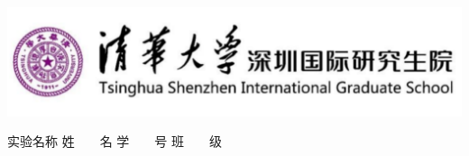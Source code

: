 \begin{titlepage}
    \voffset 2.7cm
    \begin{center}

        \includegraphics[width=15cm]{cover/logo}\\[1cm]

        \vskip 0.7cm
        \vskip 2cm
        \vskip 4cm

        \vskip 2cm
        {
            \songti 实验名称\coverunderline[5.5cm]{\hmwkClassInstructor}
            \vskip 0.7cm
            \songti 姓~~~~名\coverunderline[5.5cm]{\hmwkAuthorName}
            \vskip 0.7cm
            \songti 学~~~~号\coverunderline[5.5cm]{\hmwkStudentnum}
            \vskip 0.7cm
            \songti 班~~~~级\coverunderline[5.5cm]{\hmwkClassName}
            \vfill
        }
    \end{center}
\end{titlepage}
\songti \normalsize

\endinput
